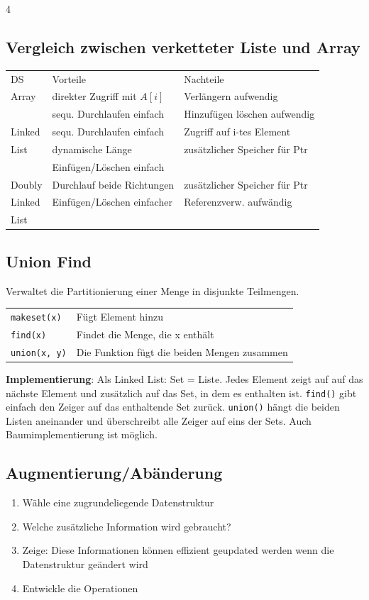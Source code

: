 \documentclass[fs, footer]{latex4ei}
\renewcommand{\t}{\texttt}
\begin{document}
\begin{multicols*}{4}
{{\subsection{Vergleich zwischen verketteter Liste und Array}
\begin{tabular}{l|l|l}
DS & Vorteile & Nachteile \\
\brule
Array & direkter Zugriff mit $A[i]$ & Verlängern aufwendig \\
 & sequ. Durchlaufen einfach & Hinzufügen löschen aufwendig \\
\brule
Linked & sequ. Durchlaufen einfach & Zugriff auf i-tes Element\\
List & dynamische Länge & zusätzlicher Speicher für Ptr\\
 & Einfügen/Löschen einfach & \\
\brule
Doubly & Durchlauf beide Richtungen & zusätzlicher Speicher für Ptr\\
Linked & Einfügen/Löschen einfacher & Referenzverw. aufwändig\\
List & & \\
\end{tabular}

\subsection{Union Find}
Verwaltet die Partitionierung einer Menge in disjunkte Teilmengen.\\
\begin{tabular}{ll}
\t{makeset(x)}& Fügt Element hinzu\\
\t{find(x)}& Findet die Menge, die x enthält\\
\t{union(x, y)}& Die Funktion fügt die beiden Mengen zusammen\\
\end{tabular}
\textbf{Implementierung}: Als Linked List: Set = Liste. Jedes Element zeigt auf auf das nächste Element und zusätzlich auf das Set, in dem es enthalten ist. \t{find()} gibt einfach den Zeiger auf das enthaltende Set zurück. \t{union()} hängt die beiden Listen aneinander und überschreibt alle Zeiger auf eins der Sets. Auch Baumimplementierung ist möglich.
\begin{minipage}{\linewidth}
\subsection{Augmentierung/Abänderung}
\begin{enumerate}
	\item Wähle eine zugrundeliegende Datenstruktur
	\item Welche zusätzliche Information wird gebraucht?
	\item Zeige: Diese Informationen können effizient geupdated werden wenn die Datenstruktur geändert wird
	\item Entwickle die Operationen
\end{enumerate}
\end{minipage}
}}
\end{multicols*}
\end{document}
